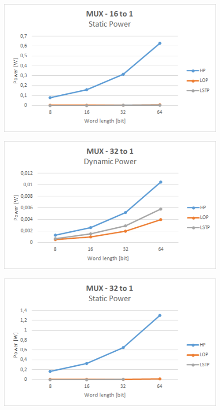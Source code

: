 \begin{figure}[!h]
	\centering
	\includegraphics[scale=0.8]{immagini/16to1S}
	\caption{\textit{}} 
	\label{4}
\end{figure}
\newpage
\begin{figure}[!h]
	\centering
	\includegraphics[scale=0.8]{immagini/32to1D}
	\caption{\textit{}} 
	\label{5}
\end{figure}

\begin{figure}[!h]
	\centering
	\includegraphics[scale=0.8]{immagini/32to1S}
	\caption{\textit{}} 
	\label{6}
\end{figure}

